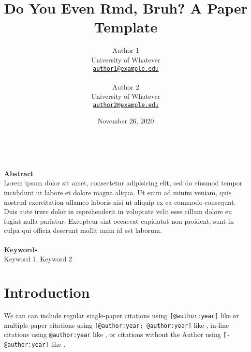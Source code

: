 \documentclass[12pt,titlepage]{mktg-article}
\begin{document}
\title{Do You Even Rmd, Bruh? A Paper Template}
\author{
    Author 1\\
  University of Whatever\\
  \href{mailto:author1@example.edu}{\nolinkurl{author1@example.edu}}\\
   \\   Author 2\\
  University of Whatever\\
  \href{mailto:author2@example.edu}{\nolinkurl{author2@example.edu}}\\
  }
\date{November 26, 2020}

\maketitle
\doublespacing

\begin{center}
{}\\
\end{center}
\vspace{4mm}
\textbf{Abstract}\\
Lorem ipsum dolor sit amet, consectetur adipisicing elit, sed do eiusmod tempor incididunt ut labore et dolore magna aliqua. Ut enim ad minim veniam, quis nostrud exercitation ullamco laboris nisi ut aliquip ex ea commodo consequat. Duis aute irure dolor in reprehenderit in voluptate velit esse cillum dolore eu fugiat nulla pariatur. Excepteur sint occaecat cupidatat non proident, sunt in culpa qui officia deserunt mollit anim id est laborum.
\\ \\
\noindent \textbf{Keywords}\\ 
Keyword 1, Keyword 2

\newpage
\hypertarget{introduction}{%
\section{Introduction}\label{introduction}}

We can can include regular single-paper citations using \texttt{{[}@author:year{]}} like \citep{Allenby:1998} or multiple-paper citations using \texttt{{[}@author:year;\ @author:year{]}} like \citep{Allenby:1998, Watanabe:2010}, in-line citations using \texttt{@author:year} like \citet{Allenby:1998}, or citations without the Author using \texttt{{[}-@author:year{]}} like \citeyearpar{Allenby:1998}.
\end{document}
